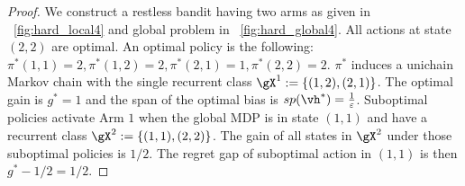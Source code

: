\begin{proof}
    We construct a restless bandit having two arms as given in \figurename~\ref{fig:hard_local4} and global problem in \figurename~\ref{fig:hard_global4}.
    All actions at state $(2,2)$ are optimal.
    An optimal policy is the following: $\pi^*(1,1)=2, \pi^*(1,2)=2, \pi^*(2,1)=1, \pi^*(2,2)=2$.
    $\pi^*$ induces a unichain Markov chain with the single recurrent class $\gX^1:=\{(1,2),(2,1)\}$.
    The optimal gain is $g^*=1$ and the span of the optimal bias is $sp(\vh^*)=\frac1\varepsilon$.
    Suboptimal policies activate Arm $1$ when the global MDP is in state $(1,1)$ and have a recurrent class $\gX^2:=\{(1,1),(2,2)\}$.
    The gain of all states in $\gX^2$ under those suboptimal policies is $1/2$.
    The regret gap of suboptimal action in $(1,1)$ is then $g^*-1/2=1/2$.


\end{proof}
